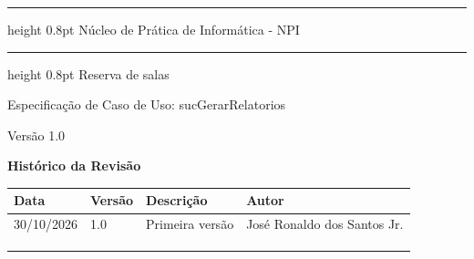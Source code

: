 \documentclass[12pt,a4paper]{article}
\newcommand{\ucnome}{sucGerarRelatorios}
\newcommand{\ucprojeto}{Reserva de salas}
\newcommand{\ucversao}{1.0}
\newcommand{\ucdata}{30/10/2026}
\newcommand{\ucautor}{José Ronaldo dos Santos Jr.}
\newcommand{\ucorgao}{Núcleo de Prática de Informática - NPI}
\newcommand{\uctitulo}{Especificação de Caso de Uso: \ucnome}
\begin{document}

\thispagestyle{empty}
\vspace*{-3.3cm}
{\bfseries
  \hrule height 0.8pt
  \vspace{10pt}
  \raggedleft \Large \ucorgao \par
  \vspace{10pt}
  \hrule height 0.8pt
  \vspace{36pt}
  \raggedleft \Large \ucprojeto \par
  \vspace{12pt}
  \raggedleft \Large \uctitulo \par
  \vspace{36pt}
  \raggedleft \large Versão \ucversao \par
}
\newpage


\begin{center}
  {\Large\bfseries Histórico da Revisão}
\end{center}

\vspace{\baselineskip}

{\small
\noindent
\begin{tabularx}{\textwidth}{|p{2.6cm}|p{1.6cm}|X|p{3.6cm}|}
  \hline
  \centering\textbf{Data} & \centering\textbf{Versão} & \centering\textbf{Descrição}
    & \centering\arraybackslash\textbf{Autor} \\
  \hline
  \ucdata & \ucversao & Primeira versão & \ucautor \\
  \hline
  & & & \\
  \hline
  & & & \\
  \hline
  & & & \\
  \hline
\end{tabularx}
\par}

\vspace{\baselineskip}

{\tableofcontents\par}
\thispagestyle{fancy}
\newpage
\end{document}
